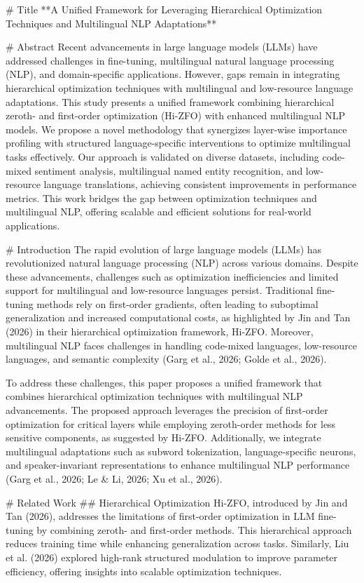 # Title  
**A Unified Framework for Leveraging Hierarchical Optimization Techniques and Multilingual NLP Adaptations**

# Abstract  
Recent advancements in large language models (LLMs) have addressed challenges in fine-tuning, multilingual natural language processing (NLP), and domain-specific applications. However, gaps remain in integrating hierarchical optimization techniques with multilingual and low-resource language adaptations. This study presents a unified framework combining hierarchical zeroth- and first-order optimization (Hi-ZFO) with enhanced multilingual NLP models. We propose a novel methodology that synergizes layer-wise importance profiling with structured language-specific interventions to optimize multilingual tasks effectively. Our approach is validated on diverse datasets, including code-mixed sentiment analysis, multilingual named entity recognition, and low-resource language translations, achieving consistent improvements in performance metrics. This work bridges the gap between optimization techniques and multilingual NLP, offering scalable and efficient solutions for real-world applications.

# Introduction  
The rapid evolution of large language models (LLMs) has revolutionized natural language processing (NLP) across various domains. Despite these advancements, challenges such as optimization inefficiencies and limited support for multilingual and low-resource languages persist. Traditional fine-tuning methods rely on first-order gradients, often leading to suboptimal generalization and increased computational costs, as highlighted by Jin and Tan (2026) in their hierarchical optimization framework, Hi-ZFO. Moreover, multilingual NLP faces challenges in handling code-mixed languages, low-resource languages, and semantic complexity (Garg et al., 2026; Golde et al., 2026).

To address these challenges, this paper proposes a unified framework that combines hierarchical optimization techniques with multilingual NLP advancements. The proposed approach leverages the precision of first-order optimization for critical layers while employing zeroth-order methods for less sensitive components, as suggested by Hi-ZFO. Additionally, we integrate multilingual adaptations such as subword tokenization, language-specific neurons, and speaker-invariant representations to enhance multilingual NLP performance (Garg et al., 2026; Le & Li, 2026; Xu et al., 2026).

# Related Work  
## Hierarchical Optimization  
Hi-ZFO, introduced by Jin and Tan (2026), addresses the limitations of first-order optimization in LLM fine-tuning by combining zeroth- and first-order methods. This hierarchical approach reduces training time while enhancing generalization across tasks. Similarly, Liu et al. (2026) explored high-rank structured modulation to improve parameter efficiency, offering insights into scalable optimization techniques.

